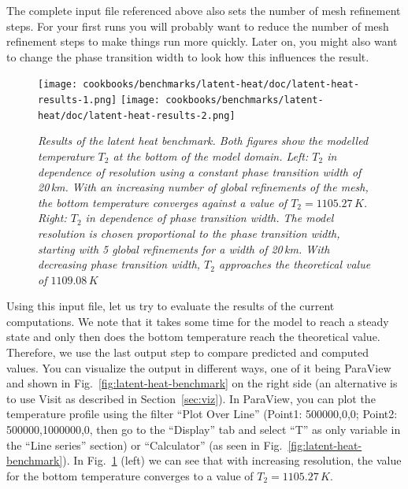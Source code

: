\documentclass{article}
\begin{document}
The complete input file referenced above also sets the number of mesh refinement
steps. For your first runs you will probably want to reduce the number of mesh
refinement steps to make things run more quickly. Later on, you might also want
to change the phase transition width to look how this influences the result.

\begin{figure}
  \begin{center}
    \texttt{[image: cookbooks/benchmarks/latent-heat/doc/latent-heat-results-1.png]}
    \hfill
    \texttt{[image: cookbooks/benchmarks/latent-heat/doc/latent-heat-results-2.png]}
  \end{center}
  \caption{\it Results of the latent heat benchmark. Both figures show the modelled temperature $T_2$ at the bottom of the model domain.
      Left: $T_2$ in dependence of resolution using a constant phase transition width of 20\,km. With an increasing number of global refinements of the mesh, the bottom temperature converges against a value of $T_2 = 1105.27 \, \si{K}$.
      Right: $T_2$ in dependence of phase transition width. The model resolution is chosen proportional to the phase transition width, starting with 5 global refinements for a width of 20\,km. With decreasing phase transition width, $T_2$ approaches the theoretical value of $1109.08 \, \si{K}$}
  \label{fig:latent-heat-benchmark-results}
\end{figure}

Using this input file, let us try to evaluate the results of the current
computations. We note that it takes some time for the model to reach a steady
state and only then does the bottom temperature reach the theoretical value.
Therefore, we use the last output step to compare predicted and computed values.
You can visualize the output in different ways, one of it being ParaView and shown in
Fig.~\ref{fig:latent-heat-benchmark} on the right side (an alternative is to use Visit as
described in Section~\ref{sec:viz}). In ParaView, you can plot the temperature profile
using the filter ``Plot Over Line'' (Point1: 500000,0,0; Point2:
500000,1000000,0, then go to the ``Display'' tab and select ``T'' as only
variable in the ``Line series'' section) or ``Calculator'' (as seen in
Fig.~\ref{fig:latent-heat-benchmark}). In
Fig.~\ref{fig:latent-heat-benchmark-results} (left) we can see that with
increasing resolution, the value for the bottom temperature converges to a value
of $T_2 = 1105.27 \, \si{K}$.
\end{document}

